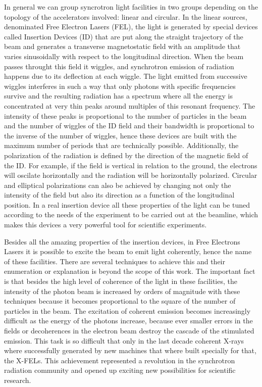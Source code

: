     In general we can group syncrotron light facilities in two groups depending on the topology of the accelerators involved: linear and circular. In the linear sources, denominated Free Electron Lasers (FEL), the light is generated by special devices called Insertion Devices (ID) that are put along the straight trajectory of the beam and generates a transverse magnetostatic field with an amplitude that varies sinusoidally with respect to the longitudinal direction. When the beam passes throught this field it wiggles, and synchrotron emission of radiation happens due to its deflection at each wiggle. The light emitted from successive wiggles interferes in such a way that only photons with specific frequencies survive and the resulting radiation has a spectrum where all the energy is concentrated at very thin peaks around multiples of this resonant frequency. The intensity of these peaks is proportional to the number of particles in the beam and the number of wiggles of the ID field and their bandwidth is proportional to the inverse of the number of wiggles, hence these devices are built with the maximum number of periods that are technically possible. Additionally, the polarization of the radiation is defined by the direction of the magnetic field of the ID. For example, if the field is vertical in relation to the ground, the electrons will oscilate horizontally and the radiation will be horizontally polarized. Circular and elliptical polarizations can also be achieved by changing not only the intensity of the field but also its direction as a function of the longitudinal position. In a real insertion device all these properties of the light can be tuned according to the needs of the experiment to be carried out at the beamline, which makes this devices a very powerful tool for scientific experiments.

    Besides all the amazing properties of the insertion devices, in Free Electrons Lasers it is possible to excite the beam to emit light coherently, hence the name of these facilities. There are several techniques to achieve this and their enumeration or explanation is beyond the scope of this work. The important fact is that besides the high level of coherence of the light in these facilities, the intensity of the photon beam is increased by orders of magnitude with these techniques because it becomes proportional to the square of the number of particles in the beam. The excitation of coherent emission becomes increasingly difficult as the energy of the photons increase, because ever smaller errors in the fields or decoherences in the electron beam destroy the cascade of the stimulated emission. This task is so difficult that only in the last decade coherent X-rays where successfully generated by new machines that where built specially for that, the X-FELs. This achievement represented a revolution in the synchrotron radiation community and opened up exciting new possibilities for scientific research.

